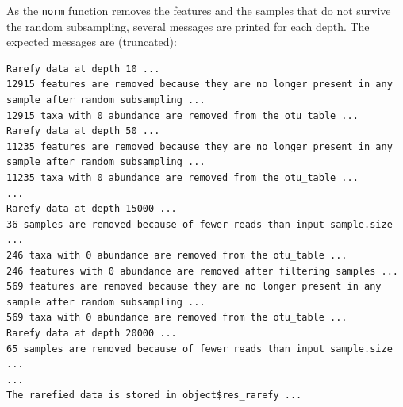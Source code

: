 \documentclass[
]{book}
\newenvironment{Shaded}{\begin{snugshade}}{\end{snugshade}}
\newcommand{\AttributeTok}[1]{\textcolor[rgb]{0.13,0.29,0.53}{#1}}
\newcommand{\CommentTok}[1]{\textcolor[rgb]{0.56,0.35,0.01}{\textit{#1}}}
\newcommand{\DecValTok}[1]{\textcolor[rgb]{0.00,0.00,0.81}{#1}}
\newcommand{\FunctionTok}[1]{\textcolor[rgb]{0.13,0.29,0.53}{\textbf{#1}}}
\newcommand{\NormalTok}[1]{#1}
\newcommand{\OtherTok}[1]{\textcolor[rgb]{0.56,0.35,0.01}{#1}}
\newcommand{\SpecialCharTok}[1]{\textcolor[rgb]{0.81,0.36,0.00}{\textbf{#1}}}
\newcommand{\StringTok}[1]{\textcolor[rgb]{0.31,0.60,0.02}{#1}}
\begin{document}
\begin{Shaded}
\end{Shaded}

As the \texttt{norm} function removes the features and the samples that do not survive the random subsampling,
several messages are printed for each depth.
The expected messages are (truncated):

\begin{verbatim}
Rarefy data at depth 10 ...
12915 features are removed because they are no longer present in any sample after random subsampling ...
12915 taxa with 0 abundance are removed from the otu_table ...
Rarefy data at depth 50 ...
11235 features are removed because they are no longer present in any sample after random subsampling ...
11235 taxa with 0 abundance are removed from the otu_table ...
...
Rarefy data at depth 15000 ...
36 samples are removed because of fewer reads than input sample.size ...
246 taxa with 0 abundance are removed from the otu_table ...
246 features with 0 abundance are removed after filtering samples ...
569 features are removed because they are no longer present in any sample after random subsampling ...
569 taxa with 0 abundance are removed from the otu_table ...
Rarefy data at depth 20000 ...
65 samples are removed because of fewer reads than input sample.size ...
...
The rarefied data is stored in object$res_rarefy ...
\end{verbatim}
\end{document}
